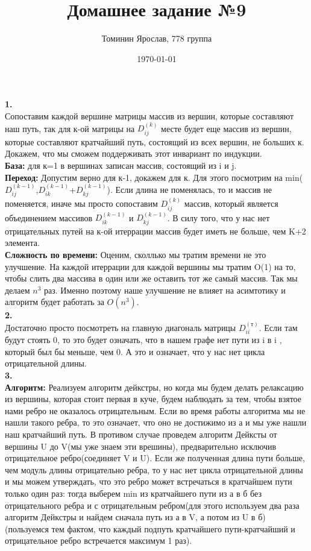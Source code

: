 \documentclass[a4paper,12pt]{article}
\author{Томинин Ярослав, 778 группа}
\title{Домашнее задание №9}
\date{\today}
\begin{document}
 

\maketitle
\newpage
\textbf{1.}\\
Сопоставим каждой вершине матрицы массив из вершин, которые составляют наш путь, так для к-ой матрицы на $D_{ij}^(k)$ месте будет еще массив из вершин, которые составляют кратчайший путь, состоящий из всех вершин, не больших к. Докажем, что мы сможем поддерживать этот инвариант по индукции.\\
\textbf{База:} для к=1 в вершинах записан массив, состоящий из i и  j.\\
\textbf{Переход:} Допустим верно для к-1, докажем для к. Для этого посмотрим на min($D_{ij}^{(k-1)}$,$D_{ik}^{(k-1)}$+$D_{kj}^{(k-1)}$). Если длина не поменялась, то и массив не поменяется, иначе мы просто сопоставим $D_{ij}^{(k)}$ массив, который является объединением массивов $D_{ik}^{(k-1)}$ и $D_{kj}^{(k-1)}$. В силу того, что у нас нет отрицательных путей на к-ой итеррации массив будет иметь не больше, чем K+2  элемента. \\
\textbf{Сложность по времени:} Оценим, сколлько мы тратим времени не это улучшение. На каждой итеррации для каждой вершины мы тратим O(1)  на то, чтобы слить два массива в один или же оставить тот же самый массив. Так мы делаем  $n^3$ раз. Именно поэтому наше улучшение не влияет на асимтотику и алгоритм будет работать за $O(n^3)$.\\
\textbf{2.}\\
Достаточно просто посмотреть на главную диагональ матрицы $D_{ii}^{(т)}$. Если там будут стоять 0, то это будет означать, что в нашем графе нет пути из i в i , который был бы меньше, чем 0. А это и означает, что у нас нет цикла отрицательной длины.\\
\textbf{3.}\\
\textbf{Алгоритм:} Реализуем алгоритм дейкстры, но когда мы будем делать релаксацию из вершины, которая стоит первая в куче, будем наблюдать за тем, чтобы взятое нами ребро не оказалось отрицательным. Если во время работы алгоритма мы не нашли такого ребра, то это означает, что оно не достижимо из а и мы уже нашли наш кратчайший путь. В противом случае проведем алгоритм Дейксты от вершины U  до V(мы уже знаем эти врешины), предварительно исключив отрицательное ребро(соединяет V и U). Если же полученная длина пути больше, чем модуль длины отрицательно ребра, то у нас нет цикла отрицательной длины и мы можем утверждать, что это ребро может встречаться в кратчайшем пути только один раз: тогда выберем min из кратчайшего пути из а в б без отрицательного ребра и с отрицательным ребром(для этого используем два раза алгоритм Дейкстры и найдем сначала путь из а в V, а потом из  U в б)(пользуемся тем фактом, что каждый подпуть кратчайшего пути-кратчайший и отрицательное ребро встречается максимум 1 раз).\\
\end{document}
